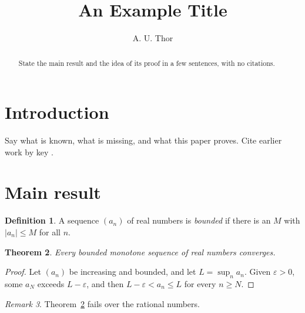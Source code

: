 \documentclass[11pt]{amsart}
\newtheorem{theorem}{Theorem}[section]
\theoremstyle{definition}
\newtheorem{definition}[theorem]{Definition}
\theoremstyle{remark}
\newtheorem{remark}[theorem]{Remark}
\begin{document}
\title{An Example Title}

\author{A. U. Thor}
\address{Department of Mathematics, Your University, City, Country}


\begin{abstract}
State the main result and the idea of its proof in a few sentences, with no
citations.
\end{abstract}

\maketitle

\section{Introduction}

Say what is known, what is missing, and what this paper proves. Cite earlier
work by key \cite{einstein1905,knuth1984}.

\section{Main result}

\begin{definition}
A sequence $(a_n)$ of real numbers is \emph{bounded} if there is an $M$ with
$|a_n| \le M$ for all $n$.
\end{definition}

\begin{theorem}\label{thm:main}
Every bounded monotone sequence of real numbers converges.
\end{theorem}

\begin{proof}
Let $(a_n)$ be increasing and bounded, and let $L = \sup_n a_n$. Given
$\varepsilon > 0$, some $a_N$ exceeds $L - \varepsilon$, and then
$L - \varepsilon < a_n \le L$ for every $n \ge N$.
\end{proof}

\begin{remark}
Theorem~\ref{thm:main} fails over the rational numbers.
\end{remark}



\end{document}
